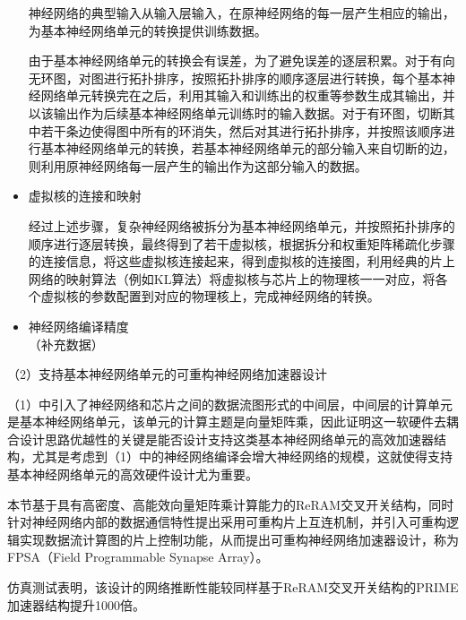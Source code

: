 \begin{itemize}
    神经网络的典型输入从输入层输入，在原神经网络的每一层产生相应的输出，为基本神经网络单元的转换提供训练数据。
    
    由于基本神经网络单元的转换会有误差，为了避免误差的逐层积累。对于有向无环图，对图进行拓扑排序，按照拓扑排序的顺序逐层进行转换，每个基本神经网络单元转换完在之后，利用其输入和训练出的权重等参数生成其输出，并以该输出作为后续基本神经网络单元训练时的输入数据。对于有环图，切断其中若干条边使得图中所有的环消失，然后对其进行拓扑排序，并按照该顺序进行基本神经网络单元的转换，若基本神经网络单元的部分输入来自切断的边，则利用原神经网络每一层产生的输出作为这部分输入的数据。
    
    \item 虚拟核的连接和映射
    
    经过上述步骤，复杂神经网络被拆分为基本神经网络单元，并按照拓扑排序的顺序进行逐层转换，最终得到了若干虚拟核，根据拆分和权重矩阵稀疏化步骤的连接信息，将这些虚拟核连接起来，得到虚拟核的连接图，利用经典的片上网络的映射算法（例如KL算法）将虚拟核与芯片上的物理核一一对应，将各个虚拟核的参数配置到对应的物理核上，完成神经网络的转换。
    
    \item 神经网络编译精度\\
    （补充数据）

\end{itemize}

（2）支持基本神经网络单元的可重构神经网络加速器设计

（1）中引入了神经网络和芯片之间的数据流图形式的中间层，中间层的计算单元是基本神经网络单元，该单元的计算主题是向量矩阵乘，因此证明这一软硬件去耦合设计思路优越性的关键是能否设计支持这类基本神经网络单元的高效加速器结构，尤其是考虑到（1）中的神经网络编译会增大神经网络的规模，这就使得支持基本神经网络单元的高效硬件设计尤为重要。

本节基于具有高密度、高能效向量矩阵乘计算能力的ReRAM交叉开关结构，同时针对神经网络内部的数据通信特性提出采用可重构片上互连机制，并引入可重构逻辑实现数据流计算图的片上控制功能，从而提出可重构神经网络加速器设计，称为FPSA（Field Programmable Synapse Array）。

仿真测试表明，该设计的网络推断性能较同样基于ReRAM交叉开关结构的PRIME加速器结构提升1000倍。

